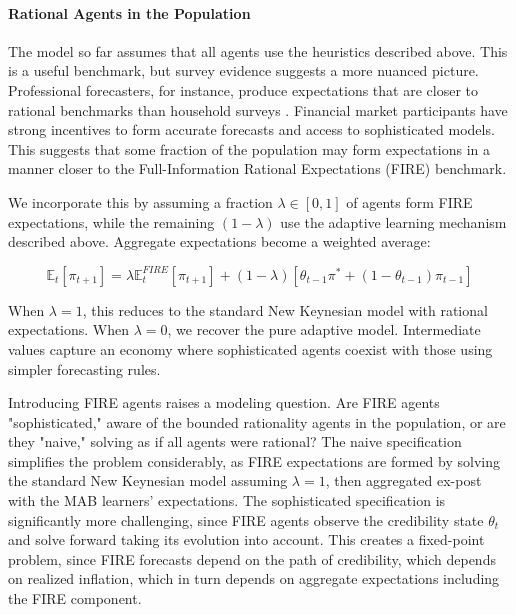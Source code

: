 \documentclass[10pt]{article}
\begin{document}
\paragraph{Rational Agents in the Population}

The model so far assumes that all agents use the heuristics described above. This is a useful benchmark, but survey evidence suggests a more nuanced picture. Professional forecasters, for instance, produce expectations that are closer to rational benchmarks than household surveys \citep{coibion2015information}. Financial market participants have strong incentives to form accurate forecasts and access to sophisticated models. This suggests that some fraction of the population may form expectations in a manner closer to the Full-Information Rational Expectations (FIRE) benchmark.

We incorporate this by assuming a fraction $\lambda \in [0,1]$ of agents form FIRE expectations, while the remaining $(1-\lambda)$ use the adaptive learning mechanism described above. Aggregate expectations become a weighted average:
  
\begin{equation} 
\label{eq:aggregate_expectations}
\mathbb{E}_t[\pi_{t+1}] = \lambda \mathbb{E}_t^{FIRE}[\pi_{t+1}] + (1-\lambda)\left[\theta_{t-1} \pi^* + (1-\theta_{t-1})\pi_{t-1}\right]
\end{equation}

When $\lambda = 1$, this reduces to the standard New Keynesian model with rational expectations. When $\lambda = 0$, we recover the pure adaptive model. Intermediate values capture an economy where sophisticated agents coexist with those using simpler forecasting rules.

Introducing FIRE agents raises a modeling question. Are FIRE agents "sophisticated," aware of the bounded rationality agents in the population, or are they "naive," solving as if all agents were rational? The naive specification simplifies the problem considerably, as FIRE expectations are formed by solving the standard New Keynesian model assuming $\lambda = 1$, then aggregated ex-post with the MAB learners' expectations. The sophisticated specification is significantly more challenging, since FIRE agents observe the credibility state $\theta_t$ and solve forward taking its evolution into account. This creates a fixed-point problem, since FIRE forecasts depend on the path of credibility, which depends on realized inflation, which in turn depends on aggregate expectations including the FIRE component.
\end{document}
